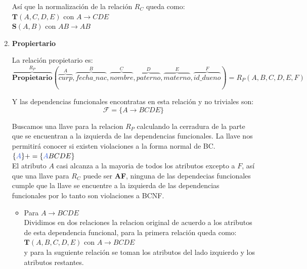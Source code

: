 \documentclass[10pt]{article}
\begin{document}
\begin{enumerate}
    Así que la normalización de la relación $R_C$ queda como:\\
    
    $\textbf{T}(A,C,D,E)$ con $A \rightarrow CDE$\\   
    $\textbf{S}(A,B)$ con $AB \rightarrow AB$\\
    
    
    \item \textbf{Propiertario}
    
    La relación propietario es:
    \[\overbrace{{\textbf{Propietario}}}^{\textbf{$R_{P}$}} 
    (
    \overbrace{curp}^{A}, \overbrace{fecha\_nac}^{B}, \overbrace{nombre}^{C}, \overbrace{paterno}^{D}, \overbrace{materno}^{E}, \overbrace{id\_dueno}^{F}
    )
    = 
    \textbf{$R_P$}(A,B,C,D,E,F)
    \]
    
    Y las dependencias funcionales encontratas en esta relación  y no triviales son:\\
    \[\mathcal{F} = \{A \rightarrow BCDE\}\]
    
    Buscamos una llave para la relacion $R_P$ calculando la cerradura de la parte que se encuentran a la izquierda de las dependencias funcionales. La llave nos permitirá conocer si existen violaciones a la forma normal de BC.\\
    
    $\{\textcolor{RoyalBlue}{A}\}+= \{\textcolor{RoyalBlue}{A}BCDE\}$\\
    
    El atributo $A$ casi alcanza a la mayoria de todos los atributos excepto a $F$, así que una llave para $R_C$ puede ser \textbf{AF}, ninguna de las dependecias funcionales cumple que la llave se encuentre a la izquierda de las dependencias funcionales por lo tanto son violaciones a BCNF.\\
    \begin{itemize}
    	\item Para $A \rightarrow BCDE$\\
    	Dividimos en dos relaciones la relacion original de acuerdo a los atributos de esta dependencia funcional, para la primera relación queda como:\\
    	
    	$\textbf{T}(A,B,C,D,E)$ con $A \rightarrow BCDE$\\
    	
    	y para la suguiente relación se toman los atributos del lado izquierdo y los atributos restantes.\\
    	

\end{itemize}
\end{enumerate}
\end{document}
